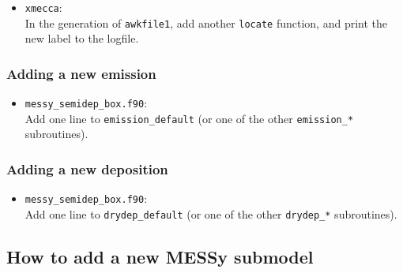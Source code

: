 \documentclass[twoside]{article}
\def\nosep{\setlength\parsep{0mm}\setlength\topsep{0mm}\setlength\itemsep{0mm}}
\begin{document}
\begin{itemize}\nosep
\item \verb|xmecca|:\\
  In the generation of \verb|awkfile1|, add another \verb|locate|
  function, and print the new label to the logfile.
\end{itemize}

\subsubsection{Adding a new emission}

\begin{itemize}\nosep
\item \verb|messy_semidep_box.f90|:\\
  Add one line to \verb|emission_default| (or one of the other
  \verb|emission_*| subroutines).
\end{itemize}

\subsubsection{Adding a new deposition}

\begin{itemize}\nosep
\item \verb|messy_semidep_box.f90|:\\
  Add one line to \verb|drydep_default| (or one of the other
  \verb|drydep_*| subroutines).
\end{itemize}

\subsection{How to add a new MESSy submodel}
\end{document}
